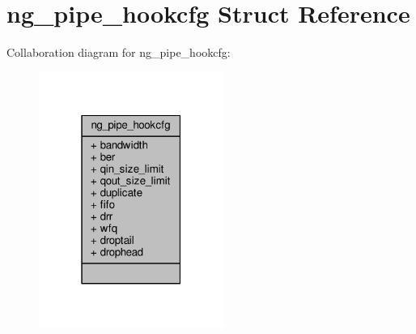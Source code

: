 \hypertarget{structng__pipe__hookcfg}{\section{ng\+\_\+pipe\+\_\+hookcfg Struct Reference}
\label{structng__pipe__hookcfg}
}


Collaboration diagram for ng\+\_\+pipe\+\_\+hookcfg\+:
\nopagebreak
\begin{figure}[H]
\begin{center}
\leavevmode
\includegraphics[width=171pt]{structng__pipe__hookcfg__coll__graph}
\end{center}
\end{figure}

